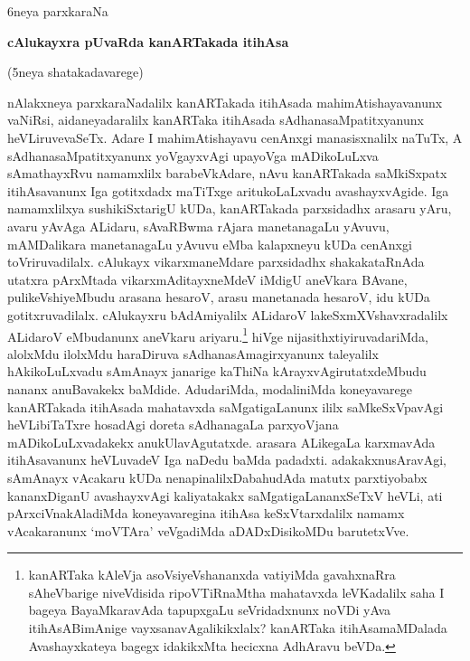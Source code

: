 \documentclass[11pt,a4size]{article}
\begin{document}
\newpage

\begin{center}
{\Huge 6neya parxkaraNa}

\smallskip
\textbf{\LARGE cAlukayxra pUvaRda kanARTakada itihAsa}

(\Large 5neya shatakadavarege)
\end{center}
  
nAlakxneya parxkaraNadalilx kanARTakada itihAsada mahimAtishayavanunx
vaNiRsi, aidaneyadaralilx kanARTaka itihAsada sAdhanasaMpatitxyanunx
heVLiruvevaSeTx. Adare I mahimAtishayavu cenAnxgi manasisxnalilx
naTuTx, A sAdhanasaMpatitxyanunx yoVgayxvAgi upayoVga mADikoLuLxva
sAmathayxRvu namamxlilx barabeVkAdare, nAvu kanARTakada saMkiSxpatx
itihAsavanunx Iga gotitxdadx maTiTxge aritukoLaLxvadu
avashayxvAgide. Iga namamxlilxya sushikiSxtarigU kUDa, kanARTakada
parxsidadhx arasaru yAru, avaru yAvAga ALidaru, sAvaRBwma rAjara
manetanagaLu yAvuvu, mAMDalikara manetanagaLu yAvuvu eMba kalapxneyu
kUDa cenAnxgi toVriruvadilalx. cAlukayx vikarxmaneMdare parxsidadhx
shakakataRnAda utatxra pArxMtada vikarxmAditayxneMdeV iMdigU aneVkara
BAvane, pulikeVshiyeMbudu arasana hesaroV, arasu manetanada hesaroV,
idu kUDa gotitxruvadilalx. cAlukayxru bAdAmiyalilx ALidaroV
lakeSxmXVshavxradalilx ALidaroV eMbudanunx aneVkaru
ariyaru.\footnote[1]{kanARTaka kAleVja asoVsiyeVshananxda vatiyiMda
  gavahxnaRra sAheVbarige niveVdisida ripoVTiRnaMtha mahatavxda
  leVKadalilx saha I bageya BayaMkaravAda tapupxgaLu seVridadxnunx
  noVDi yAva itihAsABimAnige vayxsanavAgalikikxlalx? kanARTaka
  itihAsamaMDalada Avashayxkateya bagegx idakikxMta hecicxna AdhAravu
  beVDa.} hiVge nijasithxtiyiruvadariMda, alolxMdu ilolxMdu haraDiruva
sAdhanasAmagirxyanunx taleyalilx hAkikoLuLxvadu sAmAnayx janarige
kaThiNa kArayxvAgirutatxdeMbudu nananx anuBavakekx
baMdide. AdudariMda, modaliniMda koneyavarege kanARTakada itihAsada
mahatavxda saMgatigaLanunx ililx saMkeSxVpavAgi heVLibiTaTxre hosadAgi
doreta sAdhanagaLa parxyoVjana mADikoLuLxvadakekx
anukUlavAgutatxde. arasara ALikegaLa karxmavAda itihAsavanunx
heVLuvadeV Iga naDedu baMda padadxti. adakakxnusAravAgi, sAmAnayx
vAcakaru kUDa nenapinalilxDabahudAda matutx parxtiyobabx kananxDiganU
avashayxvAgi kaliyatakakx saMgatigaLananxSeTxV heVLi, ati
pArxciVnakAladiMda koneyavaregina itihAsa keSxVtarxdalilx namamx
vAcakaranunx `moVTAra' veVgadiMda aDADxDisikoMDu barutetxVve.
\end{document}
